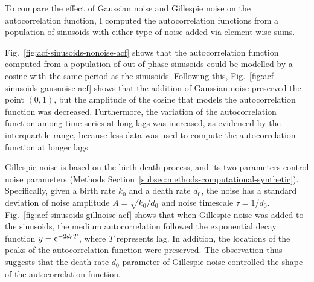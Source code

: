 To compare the effect of Gaussian noise and Gillespie noise on the autocorrelation function, I computed the autocorrelation functions from a population of sinusoids with either type of noise added via element-wise sums.


Fig.\ \ref{fig:acf-sinusoids-nonoise-acf} shows that the autocorrelation function computed from a population of out-of-phase sinusoids could be modelled by a cosine with the same period as the sinusoids.
Following this, Fig.\ \ref{fig:acf-sinusoids-gausnoise-acf} shows that the addition of Gaussian noise preserved the point $(0,1)$, but the amplitude of the cosine that models the autocorrelation function was decreased.
Furthermore, the variation of the autocorrelation function among time series at long lags was increased, as evidenced by the interquartile range, because less data was used to compute the autocorrelation function at longer lags.%

Gillespie noise is based on the birth-death process, and its two parameters control noise parameters (Methods Section~\ref{subsec:methods-computational-synthetic}).
Specifically, given a birth rate $k_{0}$ and a death rate $d_{0}$, the noise has a standard deviation of noise amplitude $A = \sqrt{k_{0}/d_{0}}$ and noise timescale $\tau = 1/d_{0}$.
Fig.\ \ref{fig:acf-sinusoids-gillnoise-acf} shows that when Gillespie noise was added to the sinusoids, the medium autocorrelation followed the exponential decay function $y = \mathrm{e}^{-2d_{0}T}$, where $T$ represents lag.
In addition, the locations of the peaks of the autocorrelation function were preserved.
The observation thus suggests that the death rate $d_{0}$ parameter of Gillespie noise controlled the shape of the autocorrelation function.


